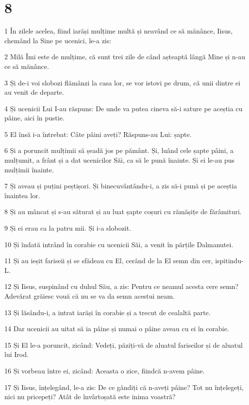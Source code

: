 \chapter{8}

\par 1 În zilele acelea, fiind iarăși mulțime multă și neavând ce să mănânce, Iisus, chemând la Sine pe ucenici, le-a zis:
\par 2 Milă Îmi este de mulțime, că sunt trei zile de când așteaptă lângă Mine și n-au ce să mănânce.
\par 3 Și de-i voi slobozi flămânzi la casa lor, se vor istovi pe drum, că unii dintre ei au venit de departe.
\par 4 Și ucenicii Lui I-au răspuns: De unde va putea cineva să-i sature pe aceștia cu pâine, aici în pustie.
\par 5 El însă i-a întrebat: Câte pâini aveți? Răspuns-au Lui: șapte.
\par 6 Și a poruncit mulțimii să șeadă jos pe pământ. Și, luând cele șapte pâini, a mulțumit, a frânt și a dat ucenicilor Săi, ca să le pună înainte. Și ei le-au pus mulțimii înainte.
\par 7 Și aveau și puțini peștișori. Și binecuvântându-i, a zis să-i pună și pe aceștia înaintea lor.
\par 8 Și au mâncat și s-au săturat și au luat șapte coșuri cu rămășițe de fărâmituri.
\par 9 Și ei erau ca la patru mii. Și i-a slobozit.
\par 10 Și îndată intrând în corabie cu ucenicii Săi, a venit în părțile Dalmanutei.
\par 11 Și au ieșit fariseii și se sfădeau cu El, cerând de la El semn din cer, ispitindu-L.
\par 12 Și Iisus, suspinând cu duhul Său, a zis: Pentru ce neamul acesta cere semn? Adevărat grăiesc vouă că nu se va da semn acestui neam.
\par 13 Și lăsându-i, a intrat iarăși în corabie și a trecut de cealaltă parte.
\par 14 Dar ucenicii au uitat să ia pâine și numai o pâine aveau cu ei în corabie.
\par 15 Și El le-a poruncit, zicând: Vedeți, păziți-vă de aluatul fariseilor și de aluatul lui Irod.
\par 16 Și vorbeau între ei, zicând: Aceasta o zice, fiindcă n-avem pâine.
\par 17 Și Iisus, înțelegând, le-a zis: De ce gândiți că n-aveți pâine? Tot nu înțelegeți, nici nu pricepeți? Atât de învârtoșată este inima voastră?
